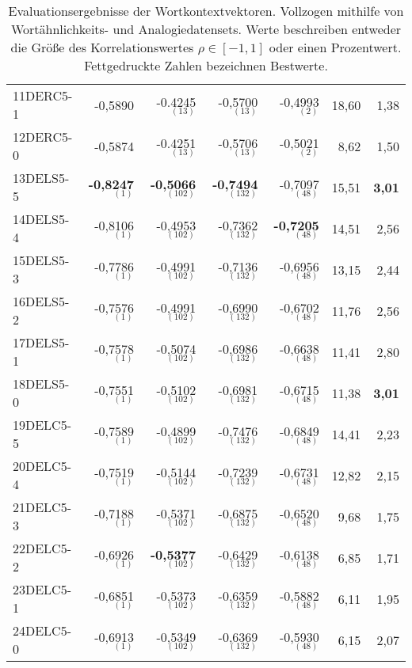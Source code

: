 \begin{table}[h]
{\begin{tabular}{@{}lrrrrrr@{}}
    11DERC5-1   & -0,5890                  & -0.4245$_{(13)}$            & -0,5700$_{(13)}$            & -0,4993$_{(2)}$           & 18,60           & 1,38  \\
    12DERC5-0   & -0,5874                  & -0.4251$_{(13)}$            & -0,5706$_{(13)}$            & -0,5021$_{(2)}$           & 8,62            & 1,50 \\[0.2cm]
    13DELS5-5  & \textbf{-0,8247$_{(1)}$} & \textbf{-0,5066$_{(102)}$}  & \textbf{-0,7494$_{(132)}$}  & -0,7097$_{(48)}$          & 15,51           & \textbf{3,01} \\
    14DELS5-4   & -0,8106$_{(1)}$          & -0,4953$_{(102)}$           & -0,7362$_{(132)}$           & \textbf{-0,7205$_{(48)}$} & 14,51           & 2,56 \\
    15DELS5-3    & -0,7786$_{(1)}$          & -0,4991$_{(102)}$           & -0,7136$_{(132)}$           & -0,6956$_{(48)}$          & 13,15           & 2,44 \\
    16DELS5-2   & -0,7576$_{(1)}$          & -0,4991$_{(102)}$           & -0,6990$_{(132)}$           & -0,6702$_{(48)}$          & 11,76           & 2,56 \\
    17DELS5-1  & -0,7578$_{(1)}$          & -0,5074$_{(102)}$           & -0,6986$_{(132)}$           & -0,6638$_{(48)}$          & 11,41           & 2,80 \\
    18DELS5-0 & -0,7551$_{(1)}$          & -0,5102$_{(102)}$           & -0,6981$_{(132)}$           & -0,6715$_{(48)}$          & 11,38           & \textbf{3,01} \\[0.2cm]
    19DELC5-5   & -0,7589$_{(1)}$          & -0,4899$_{(102)}$           & -0,7476$_{(132)}$           & -0,6849$_{(48)}$          & 14,41           & 2,23 \\
    20DELC5-4    & -0,7519$_{(1)}$          & -0,5144$_{(102)}$           & -0,7239$_{(132)}$           & -0,6731$_{(48)}$          & 12,82           & 2,15 \\
    21DELC5-3   & -0,7188$_{(1)}$          & -0,5371$_{(102)}$           & -0,6875$_{(132)}$           & -0,6520$_{(48)}$          & 9,68            & 1,75 \\
    22DELC5-2  & -0,6926$_{(1)}$          & \textbf{-0,5377$_{(102)}$}  & -0,6429$_{(132)}$           & -0,6138$_{(48)}$          & 6,85            & 1,71 \\
    23DELC5-1 & -0,6851$_{(1)}$          & -0,5373$_{(102)}$           & -0,6359$_{(132)}$           & -0,5882$_{(48)}$          & 6,11            & 1,95 \\
    24DELC5-0  & -0,6913$_{(1)}$          & -0,5349$_{(102)}$           & -0,6369$_{(132)}$           & -0,5930$_{(48)}$          & 6,15            & 2,07 \\
    \bottomrule[1.25pt]
  \end{tabular}%
  }
\caption[Evaluationsergebnisse der Wortkontextvektoren]{Evaluationsergebnisse der Wortkontextvektoren. Vollzogen mithilfe
von Wortähnlichkeits- und Analogiedatensets. Werte beschreiben entweder die Größe des Korrelationswertes $\rho \in [-1, 1]$ oder
einen Prozentwert. Fettgedruckte Zahlen bezeichnen Bestwerte.}
\end{table}

  \restoregeometry
